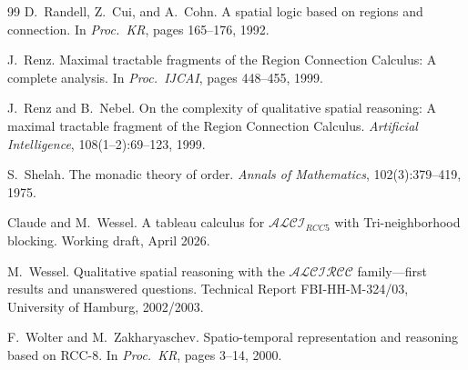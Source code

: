 \documentclass[a4paper,11pt]{article}
\theoremstyle{definition}
\begin{document}
\begin{thebibliography}{99}
D.~Randell, Z.~Cui, and A.~Cohn.
\newblock A spatial logic based on regions and connection.
\newblock In \emph{Proc.\ KR}, pages 165--176, 1992.

J.~Renz.
\newblock Maximal tractable fragments of the Region Connection
  Calculus: A complete analysis.
\newblock In \emph{Proc.\ IJCAI}, pages 448--455, 1999.

J.~Renz and B.~Nebel.
\newblock On the complexity of qualitative spatial reasoning: A
  maximal tractable fragment of the Region Connection Calculus.
\newblock \emph{Artificial Intelligence}, 108(1--2):69--123, 1999.

S.~Shelah.
\newblock The monadic theory of order.
\newblock \emph{Annals of Mathematics}, 102(3):379--419, 1975.

Claude and M.~Wessel.
\newblock A tableau calculus for $\mathcal{ALCI}_{RCC5}$ with
  Tri-neighborhood blocking.
\newblock Working draft, April 2026.

M.~Wessel.
\newblock Qualitative spatial reasoning with the $\mathcal{ALCIRCC}$
  family---first results and unanswered questions.
\newblock Technical Report FBI-HH-M-324/03, University of Hamburg,
  2002/2003.

F.~Wolter and M.~Zakharyaschev.
\newblock Spatio-temporal representation and reasoning based on RCC-8.
\newblock In \emph{Proc.\ KR}, pages 3--14, 2000.

\end{thebibliography}
\end{document}
